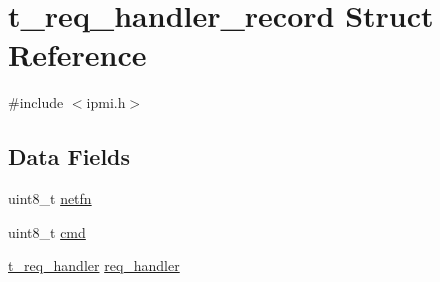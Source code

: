 \hypertarget{structt__req__handler__record}{\section{t\-\_\-req\-\_\-handler\-\_\-record Struct Reference}
\label{structt__req__handler__record}
}


{\ttfamily \#include $<$ipmi.\-h$>$}

\subsection*{Data Fields}
\begin{DoxyCompactItemize}
\item 
uint8\-\_\-t \hyperlink{structt__req__handler__record_a463c0d13acdc0decbf680df8a5acbc61}{netfn}
\item 
uint8\-\_\-t \hyperlink{structt__req__handler__record_a373d4df79039c000eaa3d1f4cb69dbee}{cmd}
\item 
\hyperlink{ipmi_8h_ae8d76fafa26fe153e5646fb94b6399fb}{t\-\_\-req\-\_\-handler} \hyperlink{structt__req__handler__record_ab826c04d89a5dda30151ce0bacb13839}{req\-\_\-handler}
\end{DoxyCompactItemize}



